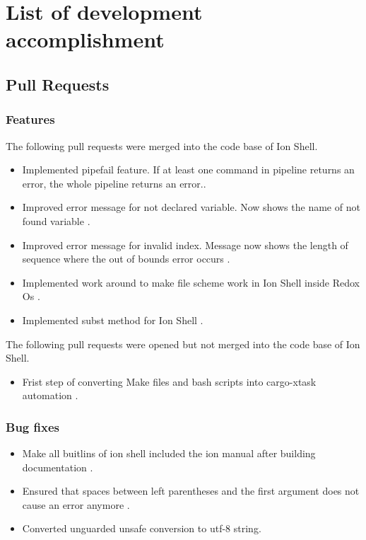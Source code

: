 \chapter{List of development accomplishment}

\section{Pull Requests}

\subsection{Features}
\label{accomplishment_features}

The following pull requests were merged into the code base of Ion Shell.

\begin{itemize}
	\item Implemented pipefail feature. If at least one command in pipeline returns an error, the whole pipeline returns an error.\cite{pr_pipefail}.
	\item Improved error message for not declared variable. Now shows the name of not found variable \cite{pr_better_not_found_variable_show}.
	\item Improved error message for invalid index. Message now shows the length of sequence where the out of bounds error occurs \cite{pr_error_message_shows_invalid_range}.
	\item Implemented work around to make file scheme work in Ion Shell inside Redox Os \cite{pr_file_scheme}.
	\item Implemented subst method for Ion Shell \cite{pr_subst_method}.
\end{itemize}

The following pull requests were opened but not merged into the code base of Ion Shell.

\begin{itemize}
	\item Frist step of converting Make files and bash scripts into cargo-xtask automation \cite{pr_still_opened_cargo_xtask}.
\end{itemize}

\subsection{Bug fixes}\label{accomplishment_bug_fixes}

\begin{itemize}
	\item Make all buitlins of ion shell included the ion manual after building documentation \cite{pr_man_history_included_ion_manual}.
	\item Ensured that spaces between left parentheses and the first argument does not cause an error anymore .\cite{pr_fix_space_before_first_paranthese}
	\item Converted unguarded unsafe conversion to utf-8 string. \cite{pr_unsave_utf8_removal}
\end{itemize}

